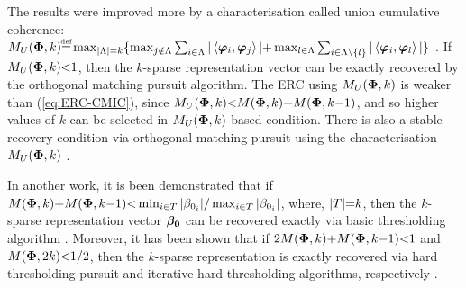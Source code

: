 The results were improved more by a characterisation called union cumulative coherence: $M_U(\myPhi , k) {\myeq} \max_{\myabs{\Lambda}=k} \{\max_{j \notin \Lambda} \sum_{i \in \Lambda} | \left\langle \boldsymbol{\varphi}_i , \boldsymbol{\varphi}_{j} \right\rangle| \spl 
\max_{l \in \Lambda} \sum_{i \in \Lambda \backslash \{ l \}} | \left\langle \boldsymbol{\varphi}_i , \boldsymbol{\varphi}_{l} \right\rangle|\}$ \cite{Dossal2005,Zhao2015a}.
If $M_U(\boldsymbol{\Phi} , k) {<} 1$, then the $k$-sparse representation vector can be exactly recovered by the orthogonal matching pursuit algorithm.  
The ERC using $M_U(\boldsymbol{\Phi} , k)$ is weaker than (\ref{eq:ERC-CMIC}), since $M_U(\boldsymbol{\Phi} , k) {<} M(\boldsymbol{\Phi} , k) {+} M(\boldsymbol{\Phi} , k {-} 1)$, and so higher values of $k$ can be selected in $M_U(\boldsymbol{\Phi} , k)$-based condition. 
There is also a stable recovery condition via orthogonal matching pursuit using the characterisation $M_U(\boldsymbol{\Phi} , k)$ \cite{Zhao2015a}.

In another work, it is been demonstrated that if $M(\boldsymbol{\Phi} , k) {+} M(\boldsymbol{\Phi} , k {-} 1) {<} \min_{i {\in} T} \vert \beta_{0_i} \vert / \max_{i {\in} T} \vert\beta_{0_i} \vert$, where, $\vert T \vert {=} k$, then the $k$-sparse representation vector $\boldsymbol{\beta_0}$ can be recovered exactly via basic thresholding algorithm \cite{Foucart2013}. 
Moreover, it has been shown that if $ 2M(\boldsymbol{\Phi} , k) {+} M(\boldsymbol{\Phi} , k {-} 1) {<} 1$ and $ M(\boldsymbol{\Phi} , 2k) {<} 1/2$, then the $k$-sparse representation is exactly recovered via hard thresholding pursuit and iterative hard thresholding algorithms, respectively \cite{Foucart2013}.